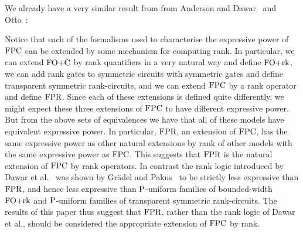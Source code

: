 \documentclass[../paper.tex]{subfiles}
\begin{document}
\begin{center}
\end{center}

We already have a very similar result from from Anderson and
Dawar~\cite{AndersonD17} and Otto~\cite{}:

\begin{center}
\end{center}

Notice that each of the formalisms used to characterise the expressive power of
$\text{\upshape FPC}$ can be extended by some mechanism for computing rank. In particular, we
can extend $\text{\upshape FO+C}$ by rank quantifiers in a very natural way and define $\text{\upshape FO+rk}$,
we can add rank gates to symmetric circuits with symmetric gates and define
transparent symmetric rank-circuits, and we can extend $\text{\upshape FPC}$ by a rank operator
and define $\text{\upshape FPR}$. Since each of these extensions is defined quite differently,
we might expect these three extensions of $\text{\upshape FPC}$ to have different expressive
power. But from the above sets of equivalences we have that all of these models
have equivalent expressive power. In particular, $\text{\upshape FPR}$, an extension of $\text{\upshape FPC}$,
has the same expressive power as other natural extensions by rank of other
models with the same expressive power as $\text{\upshape FPC}$. This suggests that $\text{\upshape FPR}$ is
the natural extension of $\text{\upshape FPC}$ by rank operators. In contrast the rank logic
introduced by Dawar et al.~\cite{} was shown by Gr\"{a}del and Pakus~\cite{} to
be strictly less expressive than $\text{\upshape FPR}$, and hence less expressive than
$\mathrm{P}$-uniform families of bounded-width $\text{\upshape FO+rk}$ and $\mathrm{P}$-uniform families of
transparent symmetric rank-circuits. The results of this paper thus suggest that
$\text{\upshape FPR}$, rather than the rank logic of Dawar et al., should be considered the
appropriate extension of $\text{\upshape FPC}$ by rank.
\end{document}

